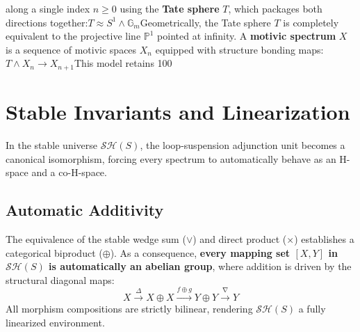 \documentclass[11pt,oneside]{article}
\begin{document}
along a single index $n \ge 0$ using the \textbf{Tate sphere} $T$, which packages both directions together:\(T\approx S^{1}\land \mathbb{G}_{m}\)Geometrically, the Tate sphere $T$ is completely equivalent to the projective line $\mathbb{P}^1$ pointed at infinity. A \textbf{motivic spectrum} $X$ is a sequence of motivic spaces $X_n$ equipped with structure bonding maps:\(T\land X_{n}\longrightarrow X_{n+1}\)This model retains 100%
    \section{Stable Invariants and Linearization}
In the stable universe $\mathcal{S}\mathcal{H}(S)$, the loop-suspension adjunction unit becomes a canonical isomorphism, forcing every spectrum to automatically behave as an H-space and a co-H-space.

\subsection{Automatic Additivity}
The equivalence of the stable wedge sum ($\vee$) and direct product ($\times$) establishes a categorical biproduct ($\oplus$). As a consequence, \textbf{every mapping set $[X,Y]$ in $\mathcal{S}\mathcal{H}(S)$ is automatically an abelian group}, where addition is driven by the structural diagonal maps:
\[ X \xrightarrow{\Delta} X \oplus X \xrightarrow{f \oplus g} Y \oplus Y \xrightarrow{\nabla} Y \]
All morphism compositions are strictly bilinear, rendering $\mathcal{S}\mathcal{H}(S)$ a fully linearized environment.
\end{document}

